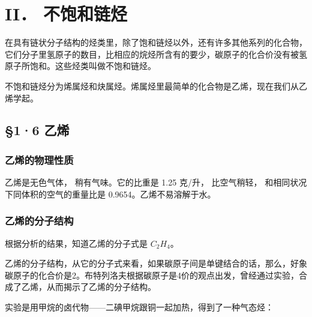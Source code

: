 \section{II． 不饱和链烃}\label{ii-ux4e0dux9971ux548cux94feux70c3}

在具有链状分子结构的烃类里，除了饱和链烃以外，还有许多其他系列的化合物，它们分子里氢原子的数目，比相应的烷烃所含有的要少，碳原子的化合价没有被氢原子所饱和。这些烃类叫做不饱和链烃。

不饱和链烃分为烯属烃和炔属烃。烯属烃里最简单的化合物是乙烯，现在我们从乙烯学起。

\subsection{§1·6 乙烯}

\subsubsection{乙烯的物理性质}

乙烯是无色气体， 稍有气味。它的比重是 1.25 克/升， 比空气稍轻，
和相同状况下同体积的空气的重量比是 0.9654。乙烯不易溶解于水。

\subsubsection{乙烯的分子结构}

根据分析的结果，知道乙烯的分子式是 \(C_{2}H_{4}\)。

乙烯的分子结构，从它的分子式来看，如果碳原子间是单键结合的话，那么，好象碳原子的化合价是2。布特列洛夫根据碳原子是4价的观点出发，曾经通过实验，合成了乙烯，从而揭示了乙烯的分子结构。

实验是用甲烷的卤代物------二碘甲烷跟铜一起加热，得到了一种气态烃：

